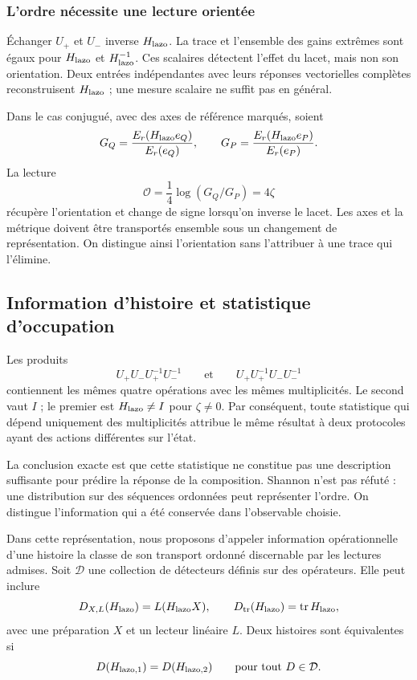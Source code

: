 \subsubsection{L’ordre nécessite une lecture orientée}
\label{md:comp:orden-orientado}

Échanger \(U_+\) et \(U_-\) inverse \(H_{\rm lazo}\).
La trace et l’ensemble des gains extrêmes sont égaux pour
\(H_{\rm lazo}\) et \(H_{\rm lazo}^{-1}\). Ces scalaires détectent
l’effet du lacet, mais non son orientation. Deux entrées
indépendantes avec leurs réponses vectorielles complètes reconstruisent
\(H_{\rm lazo}\) ; une mesure scalaire ne suffit pas en général.

Dans le cas conjugué, avec des axes de référence marqués, soient
\[
 G_Q=\frac{E_r(H_{\rm lazo}e_Q)}{E_r(e_Q)},\qquad
 G_P=\frac{E_r(H_{\rm lazo}e_P)}{E_r(e_P)}.
\]
La lecture
\begin{equation}
 \mathcal O=\frac14\log(G_Q/G_P)=4\zeta
 \label{md:comp:lector-orientado}
\end{equation}
récupère l’orientation et change de signe lorsqu’on inverse le lacet.
Les axes et la métrique doivent être transportés ensemble sous un changement
de représentation. On distingue ainsi l’orientation sans l’attribuer
à une trace qui l’élimine.

\subsection{Information d’histoire et statistique d’occupation}
\label{md:comp:informacion}

Les produits
\[
 U_+U_-U_+^{-1}U_-^{-1}
 \qquad\text{et}\qquad
 U_+U_+^{-1}U_-U_-^{-1}
\]
contiennent les mêmes quatre opérations avec les mêmes multiplicités.
Le second vaut \(I\) ; le premier est \(H_{\rm lazo}\ne I\) pour
\(\zeta\ne0\). Par conséquent, toute statistique qui dépend
uniquement des multiplicités attribue le même résultat à deux
protocoles ayant des actions différentes sur l’état.

La conclusion exacte est que cette statistique ne constitue pas une
description suffisante pour prédire la réponse de la composition.
Shannon n’est pas réfuté : une distribution sur des séquences ordonnées
peut représenter l’ordre. On distingue l’information qui a été
conservée dans l’observable choisie.

\begin{definition}
\label{md:comp:def-informacion}
Dans cette représentation, nous proposons d’appeler information opérationnelle d’une
histoire la classe de son transport ordonné discernable par les
lectures admises. Soit \(\mathcal D\) une collection de détecteurs
définis sur des opérateurs. Elle peut inclure
\[
 D_{X,L}(H_{\rm lazo})=L(H_{\rm lazo}X),
 \qquad D_{\rm tr}(H_{\rm lazo})=\operatorname{tr}H_{\rm lazo},
\]
avec une préparation \(X\) et un lecteur linéaire \(L\).
Deux histoires sont équivalentes si
\[
 D(H_{{\rm lazo},1})=D(H_{{\rm lazo},2})
 \qquad\text{pour tout }D\in\mathcal D.
\]
\end{definition}

